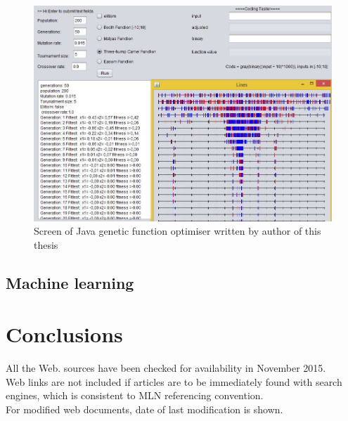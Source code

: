 \documentclass[12pt,twoside,a4paper]{article}
\begin{document}
\begin{figure}[H]
\centering
\includegraphics[width=0.7\paperwidth]{genetic}
\caption{Screen of Java genetic function optimiser written by author of this thesis \cite{morph}}
\end{figure}


\subsection{Machine learning}

\section{Conclusions}






All the Web. sources have been checked for availability in November 2015.\\
Web links are not included if articles are to be immediately found with search engines, which is consistent to MLN referencing convention.\\
For modified web documents, date of last modification is shown.
\end{document}
